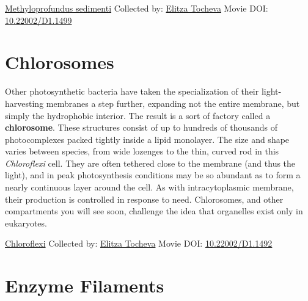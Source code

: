 \documentclass[]{tufte-book}
\begin{document}
\hypertarget{htmlwidget-4f4effecd774603bcab6}{}

\label{fig:4-3a}\protect\hyperlink{tree}{Methyloprofundus sedimenti} Collected by: \protect\hyperlink{elitza_tocheva}{Elitza Tocheva} Movie DOI: \href{https://doi.org/10.22002/D1.1499}{10.22002/D1.1499}

\hypertarget{chlorosomes}{%
\section{Chlorosomes}\label{chlorosomes}}

Other photosynthetic bacteria have taken the specialization of their light-harvesting membranes a step further, expanding not the entire membrane, but simply the hydrophobic interior. The result is a sort of factory called a \textbf{chlorosome}. These structures consist of up to hundreds of thousands of photocomplexes packed tightly inside a lipid monolayer. The size and shape varies between species, from wide lozenges to the thin, curved rod in this \emph{Chloroflexi} cell. They are often tethered close to the membrane (and thus the light), and in peak photosynthesis conditions may be so abundant as to form a nearly continuous layer around the cell. As with intracytoplasmic membrane, their production is controlled in response to need. Chlorosomes, and other compartments you will see soon, challenge the idea that organelles exist only in eukaryotes.



\hypertarget{htmlwidget-75a7afed719d5b61bac4}{}

\label{fig:4-4}\protect\hyperlink{tree}{Chloroflexi} Collected by: \protect\hyperlink{elitza_tocheva}{Elitza Tocheva} Movie DOI: \href{https://doi.org/10.22002/D1.1492}{10.22002/D1.1492}

\hypertarget{enzyme-filaments}{%
\section{Enzyme Filaments}\label{enzyme-filaments}}
\end{document}
